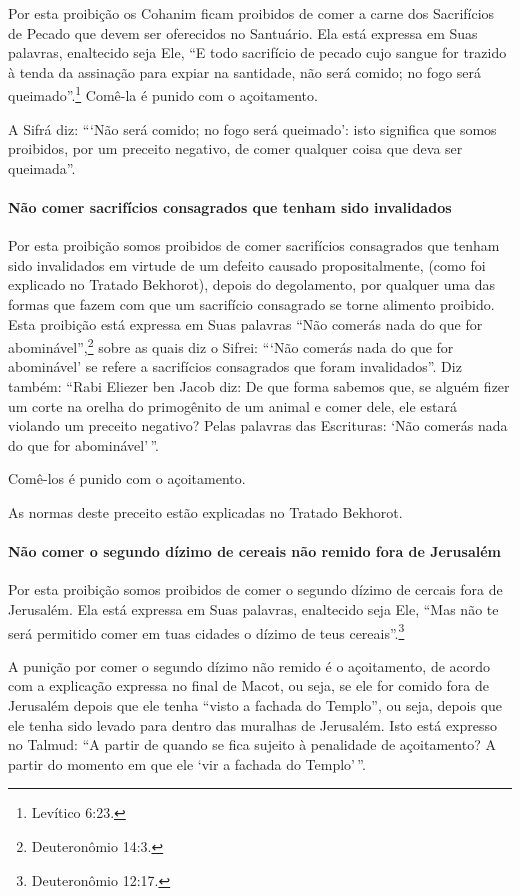 Por esta proibição os Cohanim ficam proibidos de comer a carne dos
Sacrifícios de Pecado que devem ser oferecidos no Santuário. Ela está
expressa em Suas palavras, enaltecido seja Ele, ``E todo sacrifício de
pecado cujo sangue for trazido à tenda da assinação para expiar na
santidade, não será comido; no fogo será queimado''.\footnote{Levítico 6:23.}
Comê-la é punido com o açoitamento.

A Sifrá diz: ```Não será comido; no fogo será queimado': isto significa
que somos proibidos, por um preceito negativo, de comer qualquer coisa
que deva ser queimada''.

\paragraph{Não comer sacrifícios consagrados que tenham sido invalidados}

Por esta proibição somos proibidos de comer sacrifícios consagrados que
tenham sido invalidados em virtude de um defeito causado
propositalmente, (como foi explicado no Tratado Bekhorot), depois do
degolamento, por qualquer uma das formas que fazem com que um sacrifício consagrado se
torne alimento proibido. Esta proibição está expressa em Suas palavras
``Não comerás nada do que for abominável'',\footnote{Deuteronômio 14:3.} sobre
as quais diz o Sifrei: ```Não comerás nada do que for abominável' se
refere a sacrifícios consagrados que foram invalidados''. Diz também:
``Rabi Eliezer ben Jacob diz: De que forma sabemos que, se alguém fizer
um corte na orelha do primogênito de um animal e comer dele, ele estará
violando um preceito negativo? Pelas palavras das Escrituras: `Não
comerás nada do que for abominável'\,''.

Comê-los é punido com o açoitamento.

As normas deste preceito estão explicadas no Tratado Bekhorot.

\paragraph{Não comer o segundo dízimo de cereais não remido fora de Jerusalém}

Por esta proibição somos proibidos de comer o segundo dízimo de cercais
fora de Jerusalém. Ela está expressa em Suas palavras, enaltecido seja
Ele, ``Mas não te será permitido comer em tuas cidades o dízimo de teus
cereais''.\footnote{Deuteronômio 12:17.}

A punição por comer o segundo dízimo não remido é o açoitamento, de
acordo com a explicação expressa no final de Macot, ou seja, se ele for
comido fora de Jerusalém depois que ele tenha ``visto a fachada do
Templo'', ou seja, depois que ele tenha sido levado para dentro das
muralhas de Jerusalém. Isto está expresso no Talmud: ``A partir de
quando se fica sujeito à penalidade de açoitamento? A partir do momento
em que ele `vir a fachada do Templo'\,''.

